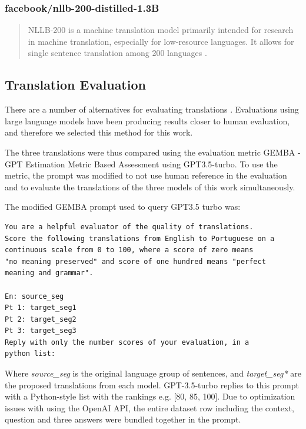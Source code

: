 \documentclass{article}
\begin{document}
\subsubsection{facebook/nllb-200-distilled-1.3B}

\begin{quote}
NLLB-200 is a machine translation model primarily intended for research in
machine translation, especially for low-resource languages. It allows for
single sentence translation among 200 languages \cite{costa2022no}.
\end{quote}

\subsection{Translation Evaluation}
\label{subsec:translation-evaluation}

There are a number of alternatives for evaluating translations
\cite{lee2023survey}. Evaluations using large language models have been producing
results closer to human evaluation, and therefore we selected this method for
this work.

The three translations were thus compared using the evaluation metric
GEMBA - GPT Estimation Metric Based Assessment \cite{kocmi2023large} using
GPT3.5-turbo. To use the metric, the prompt was modified to not use human
reference in the evaluation and to evaluate the translations of the three models
of this work simultaneously.

The modified GEMBA prompt used to query GPT3.5 turbo was:

\begin{verbatim}
You are a helpful evaluator of the quality of translations.
Score the following translations from English to Portuguese on a
continuous scale from 0 to 100, where a score of zero means
"no meaning preserved" and score of one hundred means "perfect
meaning and grammar".

En: source_seg
Pt 1: target_seg1
Pt 2: target_seg2
Pt 3: target_seg3
Reply with only the number scores of your evaluation, in a 
python list:
\end{verbatim}

Where \emph{source\_seg} is the original language group of sentences, and
\emph{target\_seg*} are the proposed translations from each model. GPT-3.5-turbo
replies to this prompt with a Python-style list with the rankings e.g. [80, 85,
100]. Due to optimization issues with using the OpenAI API, the entire dataset
row including the context, question and three answers were bundled together in
the prompt.
\end{document}
